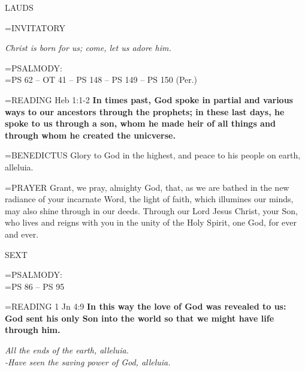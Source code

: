 \begin{flushleft}\normalsize LAUDS\\\end{flushleft}

\hangindent=\parindent \small{INVITATORY}
\begin{center}
\textit{Christ is born for us; come, let us adore him.\\}
\end{center}

\hangindent=\parindent \small{PSALMODY:}\\
\hangindent=\parindent  PS 62 -- OT 41 -- PS 148 -- PS 149 -- PS 150 (Per.) \vspace{0.5em}

\hangindent=\parindent \small{READING}    Heb 1:1-2 \textbf{   In times past, God spoke in partial and various ways to our ancestors through the prophets; in these last days, he spoke to us through a son, whom he made heir of all things and through whom he created the unicverse.\\}

\hangindent=\parindent \small{BENEDICTUS 	Glory to God in the highest, and peace to his people on earth, alleluia.\\}

\hangindent=\parindent \small{PRAYER 	Grant, we pray, almighty God, that, as we are bathed in the new radiance of your incarnate Word, the light of faith, which illumines our minds, may also shine through in our deeds. Through our Lord Jesus Christ, your Son, who lives and reigns with you in the unity of the Holy Spirit, one God, for ever and ever.}

\begin{flushleft}\normalsize SEXT\\\end{flushleft}

\hangindent=\parindent \small{PSALMODY:}\\
\hangindent=\parindent  PS 86 -- PS 95\vspace{0.5em}

\hangindent=\parindent \small{READING}    1 Jn 4:9 \textbf{    In this way the love of God was revealed to us: God sent his only Son into the world so that we might have life through him.}

\begin{center}
\textit{All the ends of the earth, alleluia.\\
-Have seen the saving power of God, alleluia.}
\end{center}

